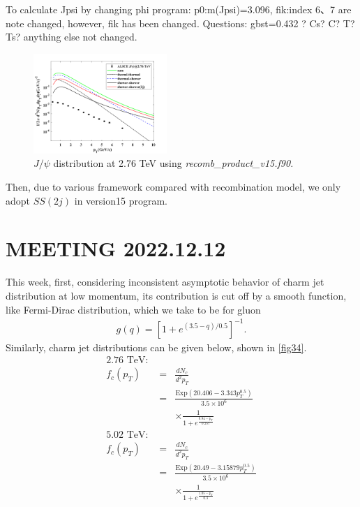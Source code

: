 \documentclass[twocolumn,aps,superscriptaddress,nofootinbib,floatfix]{revtex4}
\begin{document}
To calculate Jpsi by changing phi program: p0:m(Jpsi)=3.096, fik:index 6、7 are note changed, however, fik has been changed.
Questions: gbst=0.432 ? Cs? C? T? Ts? anything else not changed.
\begin{figure}[H]
	\includegraphics[width=0.45\textwidth]{Jpsi276_Zhu.png}
	\caption{$J/\psi$ distribution at 2.76 TeV using \itshape{recomb\_product\_v15.f90}. }
	\label{fig33}
\end{figure}

Then, due to various framework compared with recombination model, we only adopt $SS(2j)$ in version15 program.

\section{MEETING 2022.12.12}
This week, first, considering inconsistent asymptotic behavior of charm jet distribution at low momentum, its contribution is cut off by a smooth function, like Fermi-Dirac distribution, which we take to be \cite{PhysRevC.84.064914} for gluon
\begin{eqnarray}
	g(q)=[1+e^{(3.5-q)/0.5}]^{-1}.\label{QuenchFiqc}
\end{eqnarray}
Similarly, charm jet distributions can be given below, shown in \ref{fig34}.
 \begin{eqnarray}
 	\text{2.76 TeV: }\nonumber\\ 
 	f_c(p_T)&=&\frac{dN_c}{d^2 p_T}\nonumber\\ 
 	&=&\frac{\text{Exp}(20.406 - 3.343 p_T^{0.5})}{3.5\times10^6}\nonumber\\
 	&&\times \frac{1}{1+e^{\frac{0.84-p_T}{0.257}}}\\ \label{fit_276}
 	\text{5.02 TeV: }\nonumber\\ 
 	f_c(p_T)&=&\frac{dN_c}{d^2 p_T}\nonumber\\ 
 	&=&\frac{\text{Exp}(20.49 - 3.15879 p_T^{0.5})}{3.5\times10^6}\nonumber\\
 	&&\times \frac{1}{1+e^{\frac{1.05-p_T}{0.3}}}  \label{fit_502}
 \end{eqnarray}
\end{document}
